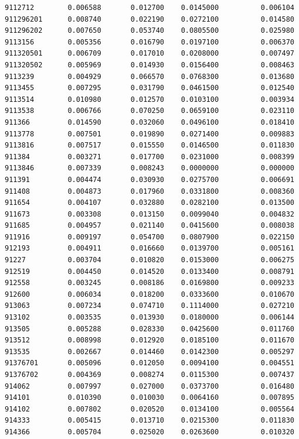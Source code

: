 \documentclass[
  letterpaper,
  DIV=11,
  numbers=noendperiod]{scrartcl}
\begin{document}
\begin{verbatim}
9112712        0.006588       0.012700    0.0145000          0.006104
911296201      0.008740       0.022190    0.0272100          0.014580
911296202      0.007650       0.053740    0.0805500          0.025980
9113156        0.005356       0.016790    0.0197100          0.006370
911320501      0.006709       0.017010    0.0208000          0.007497
911320502      0.005969       0.014930    0.0156400          0.008463
9113239        0.004929       0.066570    0.0768300          0.013680
9113455        0.007295       0.031790    0.0461500          0.012540
9113514        0.010980       0.012570    0.0103100          0.003934
9113538        0.006766       0.070250    0.0659100          0.023110
911366         0.014590       0.032060    0.0496100          0.018410
9113778        0.007501       0.019890    0.0271400          0.009883
9113816        0.007517       0.015550    0.0146500          0.011830
911384         0.003271       0.017700    0.0231000          0.008399
9113846        0.007339       0.008243    0.0000000          0.000000
911391         0.004474       0.030930    0.0275700          0.006691
911408         0.004873       0.017960    0.0331800          0.008360
911654         0.004107       0.032880    0.0282100          0.013500
911673         0.003308       0.013150    0.0099040          0.004832
911685         0.004957       0.021140    0.0415600          0.008038
911916         0.009197       0.054700    0.0807900          0.022150
912193         0.004911       0.016660    0.0139700          0.005161
91227          0.003704       0.010820    0.0153000          0.006275
912519         0.004450       0.014520    0.0133400          0.008791
912558         0.003245       0.008186    0.0169800          0.009233
912600         0.006034       0.018200    0.0333600          0.010670
913063         0.007234       0.074710    0.1114000          0.027210
913102         0.003535       0.013930    0.0180000          0.006144
913505         0.005288       0.028330    0.0425600          0.011760
913512         0.008998       0.012920    0.0185100          0.011670
913535         0.002667       0.014460    0.0142300          0.005297
91376701       0.005096       0.012050    0.0094100          0.004551
91376702       0.004369       0.008274    0.0115300          0.007437
914062         0.007997       0.027000    0.0373700          0.016480
914101         0.010390       0.010030    0.0064160          0.007895
914102         0.007802       0.020520    0.0134100          0.005564
914333         0.005415       0.013710    0.0215300          0.011830
914366         0.005704       0.025020    0.0263600          0.010320

\end{verbatim}
\end{document}
